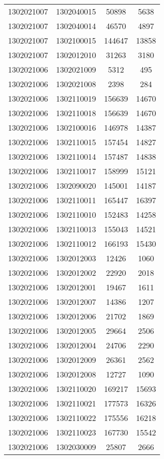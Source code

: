 \begin{longtable}[h]{llcc}
		1302021007 & 1302040015 & 50898 & 5638\\
		1302021007 & 1302040014 & 46570 & 4897\\
		1302021007 & 1302100015 & 144647 & 13858\\
		1302021007 & 1302012010 & 31263 & 3180\\
		1302021006 & 1302021009 & 5312 & 495\\
		1302021006 & 1302021008 & 2398 & 284\\
		1302021006 & 1302110019 & 156639 & 14670\\
		1302021006 & 1302110018 & 156639 & 14670\\
		1302021006 & 1302100016 & 146978 & 14387\\
		1302021006 & 1302110015 & 157454 & 14827\\
		1302021006 & 1302110014 & 157487 & 14838\\
		1302021006 & 1302110017 & 158999 & 15121\\
		1302021006 & 1302090020 & 145001 & 14187\\
		1302021006 & 1302110011 & 165447 & 16397\\
		1302021006 & 1302110010 & 152483 & 14258\\
		1302021006 & 1302110013 & 155043 & 14521\\
		1302021006 & 1302110012 & 166193 & 15430\\
		1302021006 & 1302012003 & 12426 & 1060\\
		1302021006 & 1302012002 & 22920 & 2018\\
		1302021006 & 1302012001 & 19467 & 1611\\
		1302021006 & 1302012007 & 14386 & 1207\\
		1302021006 & 1302012006 & 21702 & 1869\\
		1302021006 & 1302012005 & 29664 & 2506\\
		1302021006 & 1302012004 & 24706 & 2290\\
		1302021006 & 1302012009 & 26361 & 2562\\
		1302021006 & 1302012008 & 12727 & 1090\\
		1302021006 & 1302110020 & 169217 & 15693\\
		1302021006 & 1302110021 & 177573 & 16326\\
		1302021006 & 1302110022 & 175556 & 16218\\
		1302021006 & 1302110023 & 167730 & 15542\\
		1302021006 & 1302030009 & 25807 & 2666\\

\end{longtable}

